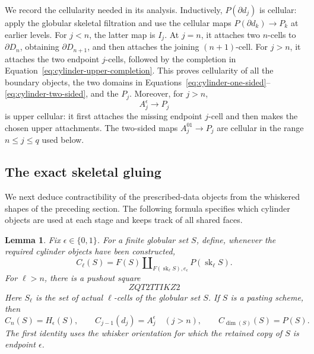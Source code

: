 \documentclass[11pt,letterpaper]{article}
\numberwithin{equation}{section}
\theoremstyle{plain}
\newtheorem{lemma}[theorem]{Lemma}
\theoremstyle{definition}
\theoremstyle{remark}
\begin{document}
We record the cellularity needed in its analysis.  Inductively,
\(P(\partial d_j)\) is cellular: apply the globular skeletal
filtration and use the cellular maps
\(P(\partial d_k)\to P_k\) at earlier levels.  For \(j<n\),
the latter map is \(I_j\).  At \(j=n\), it attaches two
\(n\)-cells to \(\partial D_n\), obtaining
\(\partial D_{n+1}\), and then attaches the joining
\((n+1)\)-cell.  For \(j>n\), it attaches the two endpoint
\(j\)-cells, followed by the completion in
Equation~\eqref{eq:cylinder-upper-completion}.  This proves cellularity
of all the boundary objects, the two domains in
Equations~\eqref{eq:cylinder-one-sided}--\eqref{eq:cylinder-two-sided},
and the \(P_j\).  Moreover, for \(j>n\),
\begin{equation}\label{eq:cylinder-upper-one-sided}
                     A_j^\epsilon\longrightarrow P_j
\end{equation}
is upper cellular: it first attaches the missing endpoint \(j\)-cell
and then makes the chosen upper attachments.  The two-sided maps
\(A_j^{01}\to P_j\) are cellular in the range \(n\le j\le q\)
used below.

\subsection{The exact skeletal gluing}

We next deduce contractibility of the prescribed-data objects from the
whiskered shapes of the preceding section.  The following formula
specifies which cylinder objects are used at each stage and keeps track
of all shared faces.

\begin{lemma}\label{lem:cylinder-skeletal-gluing}
Fix \(\epsilon\in\{0,1\}\).  For a finite globular set \(S\),
define, whenever the required cylinder objects have been constructed,
\begin{equation}\label{eq:cylinder-skeletal-stage}
 C_\ell(S)=F(S)\amalg_{F(\operatorname{sk}_\ell S),e_\epsilon}
                                 P(\operatorname{sk}_\ell S).
\end{equation}
For \(\ell>n\), there is a pushout square
\begin{equation}\label{eq:cylinder-skeletal-pushout}
ZQT2TTIKZ2
\end{equation}
Here \(S_\ell\) is the set of actual \(\ell\)-cells of the
globular set \(S\).  If \(S\) is a pasting scheme, then
\begin{equation}\label{eq:cylinder-skeletal-ends}
 C_n(S)=H_\epsilon(S),\qquad
 C_{j-1}(d_j)=A_j^\epsilon\quad(j>n),\qquad
 C_{\dim(S)}(S)=P(S).
\end{equation}
The first identity uses the whisker orientation for which the retained
copy of \(S\) is endpoint \(\epsilon\).
\end{lemma}
\end{document}
